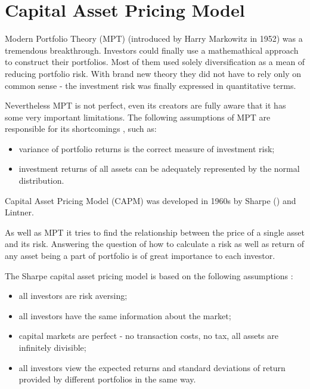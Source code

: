 
\section{Capital Asset Pricing Model}
\label{CAPM}


Modern Portfolio Theory (MPT) (introduced by Harry Markowitz in 1952) was a tremendous breakthrough. 
Investors could finally use a mathemathical approach to construct their portfolios.
Most of them used solely diversification as a mean of reducing portfolio risk.
With brand new theory they did not have to rely only on common sense - the investment risk was finally expressed in quantitative terms. 

Nevertheless MPT is not perfect, even its creators are fully aware that it has some very important limitations.
The following assumptions of MPT are responsible for its shortcomings \cite{MPT}, such as:
\begin{itemize}
  \item variance of portfolio returns is the correct measure of investment risk;
  \item investment returns of all assets can be adequately represented by the normal distribution.
\end{itemize}

  

Capital Asset Pricing Model (CAPM) was developed in 1960s by Sharpe (\cite{CAPM-Sharpe}) and Lintner.
 
As well as MPT it tries to find the relationship between the price of a single asset and its risk.
Answering the question of how to calculate a risk as well as return of any asset being a part of portfolio is of great importance to each investor.

The Sharpe capital asset pricing model is based on the following assumptions \cite{CAPM}:

\begin{itemize}
  \item all investors are risk aversing;
  \item all investors have the same information about the market;
  \item capital markets are perfect - no transaction costs, no tax, all assets are infinitely divisible;
  \item all investors view the expected returns and standard deviations of return provided by different portfolios in the same way.
\end{itemize}
 
